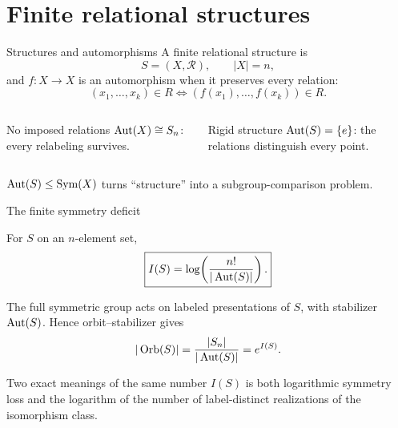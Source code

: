 \section{Finite relational structures}

\begin{frame}{Structures and automorphisms}
  A finite relational structure is
  \[
    S=(X,\mathcal R), \qquad |X|=n,
  \]
  and $f:X\to X$ is an automorphism when it preserves every relation:
  \[
    (x_1,\ldots,x_k)\in R
    \iff
    (f(x_1),\ldots,f(x_k))\in R.
  \]

  \begin{columns}[T]
      \begin{block}{No imposed relations}
        $\operatorname{Aut}(X)\cong S_n$: every relabeling survives.
      \end{block}
      \begin{block}{Rigid structure}
        $\operatorname{Aut}(S)=\{e\}$: the relations distinguish every point.
      \end{block}
  \end{columns}

  \begin{center}
    \textcolor{RelGray}{$\operatorname{Aut}(S)\leq \operatorname{Sym}(X)$ turns ``structure'' into a
    subgroup-comparison problem.}
  \end{center}
\end{frame}

\begin{frame}{The finite symmetry deficit}
  \begin{definition}
    For $S$ on an $n$-element set,
    \[
      \boxed{I(S)=\log\!\left(\frac{n!}{|\operatorname{Aut}(S)|}\right).}
    \]
  \end{definition}

  The full symmetric group acts on labeled presentations of $S$, with
  stabilizer $\operatorname{Aut}(S)$. Hence orbit--stabilizer gives
  \[
    |\operatorname{Orb}(S)|
      =\frac{|S_n|}{|\operatorname{Aut}(S)|}
      =e^{I(S)}.
  \]

  \begin{alertblock}{Two exact meanings of the same number}
    $I(S)$ is both logarithmic symmetry loss and the logarithm of the number of
    label-distinct realizations of the isomorphism class.
  \end{alertblock}
\end{frame}

